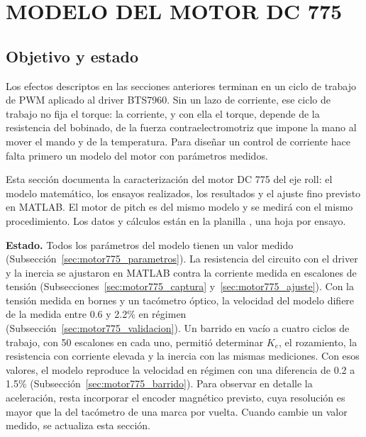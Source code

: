 \section{MODELO DEL MOTOR DC 775}
\label{sec:motor775}

\subsection{Objetivo y estado}
\label{sec:motor775_objetivo}
Los efectos descriptos en las secciones anteriores terminan en un ciclo de trabajo de PWM aplicado al driver BTS7960. Sin un lazo de corriente, ese ciclo de trabajo no fija el torque: la corriente, y con ella el torque, depende de la resistencia del bobinado, de la fuerza contraelectromotriz que impone la mano al mover el mando y de la temperatura. Para diseñar un control de corriente hace falta primero un modelo del motor con parámetros medidos.

Esta sección documenta la caracterización del motor DC 775 del eje roll: el modelo matemático, los ensayos realizados, los resultados y el ajuste fino previsto en MATLAB. El motor de pitch es del mismo modelo y se medirá con el mismo procedimiento. Los datos y cálculos están en la planilla , una hoja por ensayo.

\textbf{Estado.} Todos los parámetros del modelo tienen un valor medido (Subsección~\ref{sec:motor775_parametros}). La resistencia del circuito con el driver y la inercia se ajustaron en MATLAB contra la corriente medida en escalones de tensión (Subsecciones~\ref{sec:motor775_captura} y~\ref{sec:motor775_ajuste}). Con la tensión medida en bornes y un tacómetro óptico, la velocidad del modelo difiere de la medida entre 0.6 y 2.2\% en régimen (Subsección~\ref{sec:motor775_validacion}). Un barrido en vacío a cuatro ciclos de trabajo, con 50 escalones en cada uno, permitió determinar $K_e$, el rozamiento, la resistencia con corriente elevada y la inercia con las mismas mediciones. Con esos valores, el modelo reproduce la velocidad en régimen con una diferencia de 0.2 a 1.5\% (Subsección~\ref{sec:motor775_barrido}). Para observar en detalle la aceleración, resta incorporar el encoder magnético previsto, cuya resolución es mayor que la del tacómetro de una marca por vuelta. Cuando cambie un valor medido, se actualiza esta sección.

